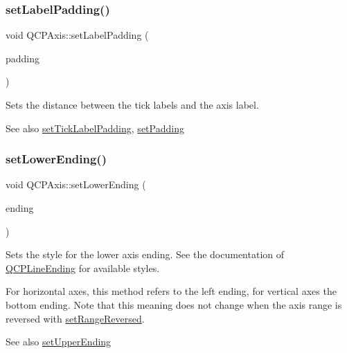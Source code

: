 \subsubsection{\texorpdfstring{set\+Label\+Padding()}{setLabelPadding()}}
{\footnotesize\ttfamily void Q\+C\+P\+Axis\+::set\+Label\+Padding (\begin{DoxyParamCaption}\item[{int}]{padding }\end{DoxyParamCaption})}

Sets the distance between the tick labels and the axis label.

\begin{DoxySeeAlso}{See also}
\hyperlink{class_q_c_p_axis_af302c479af9dbc2e9f0e44e07c0012ee}{set\+Tick\+Label\+Padding}, \hyperlink{class_q_c_p_axis_a5691441cb3de9e9844855d339c0db279}{set\+Padding} 
\end{DoxySeeAlso}
\mbox{\label{class_q_c_p_axis_a08af1c72db9ae4dc8cb8a973d44405ab}} 
\subsubsection{\texorpdfstring{set\+Lower\+Ending()}{setLowerEnding()}}
{\footnotesize\ttfamily void Q\+C\+P\+Axis\+::set\+Lower\+Ending (\begin{DoxyParamCaption}\item[{const \hyperlink{class_q_c_p_line_ending}{Q\+C\+P\+Line\+Ending} \&}]{ending }\end{DoxyParamCaption})}

Sets the style for the lower axis ending. See the documentation of \hyperlink{class_q_c_p_line_ending}{Q\+C\+P\+Line\+Ending} for available styles.

For horizontal axes, this method refers to the left ending, for vertical axes the bottom ending. Note that this meaning does not change when the axis range is reversed with \hyperlink{class_q_c_p_axis_a2172fdb196b1a0dc3f40992fcad8e9e1}{set\+Range\+Reversed}.

\begin{DoxySeeAlso}{See also}
\hyperlink{class_q_c_p_axis_a69119b892fc306f651763596685aa377}{set\+Upper\+Ending} 
\end{DoxySeeAlso}
\mbox{\label{class_q_c_p_axis_ae585a54dc2aac662e90a2ca82f002590}} 
